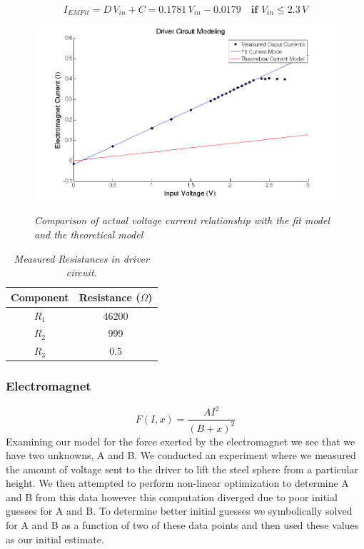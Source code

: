 \documentclass{article}
\theoremstyle{plain}
\theoremstyle{definition}
\theoremstyle{remark}
\begin{document}
$$ I_{EM Fit} = D \, V_{in} + C = 0.1781 \, V_{in} - 0.0179  \quad \textbf{if } V_{in} \leq 2.3 \, V $$

\begin{figure}
\begin{center}
\includegraphics[width = 13cm]{DriverCircuitModel.png}
\label{Q1_d2}
\caption{\emph{Comparison of actual voltage current relationship with the fit model and the theoretical model}}
\end{center}
\end{figure}

\begin{table}
\begin{center}
    \begin{tabular}{|c|c|}
        \hline
        Component & Resistance ($\Omega$) \\ \hline
        $R_{1}$   & 46200                 \\ 
        $R_{2}$   & 999                   \\ 
        $R_{3}$   & 0.5                   \\
        \hline
    \end{tabular}
\caption{\emph{Measured Resistances in driver circuit.}}
\label{Q1_dt3}
\end{center}
\end{table}

\subsubsection*{Electromagnet}
$$ F(I,x) = \frac{A I^2}{(B+x)^2} $$
Examining our model for the force exerted by the electromagnet we see that we have two unknowns, A and B.  We conducted an experiment where we measured the amount of voltage sent to the driver to lift the steel sphere from a particular height.  We then attempted to perform non-linear optimization to determine A and B from this data however this computation diverged due to poor initial guesses for A and B.  To determine better initial guesses we symbolically solved for A and B as a function of two of these data points and then used these values as our initial estimate.\\  
\end{document}

